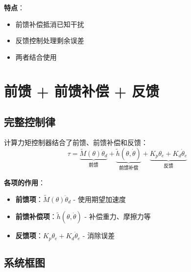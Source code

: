 \documentclass[12pt,a4paper]{article}
\begin{document}
\textbf{特点}：
\begin{itemize}
\item 前馈补偿抵消已知干扰
\item 反馈控制处理剩余误差
\item 两者结合使用
\end{itemize}

\section{前馈 + 前馈补偿 + 反馈}

\subsection{完整控制律}

计算力矩控制器结合了前馈、前馈补偿和反馈：
\begin{equation}
\tau = \underbrace{\tilde{M}(\theta)\ddot{\theta}_d}_{\text{前馈}} + \underbrace{\tilde{h}(\theta, \dot{\theta})}_{\text{前馈补偿}} + \underbrace{K_p\theta_e + K_d\dot{\theta}_e}_{\text{反馈}}
\end{equation}

\textbf{各项的作用}：
\begin{itemize}
\item \textbf{前馈项}：$\tilde{M}(\theta)\ddot{\theta}_d$ - 使用期望加速度
\item \textbf{前馈补偿项}：$\tilde{h}(\theta, \dot{\theta})$ - 补偿重力、摩擦力等
\item \textbf{反馈项}：$K_p\theta_e + K_d\dot{\theta}_e$ - 消除误差
\end{itemize}

\subsection{系统框图}
\end{document}
